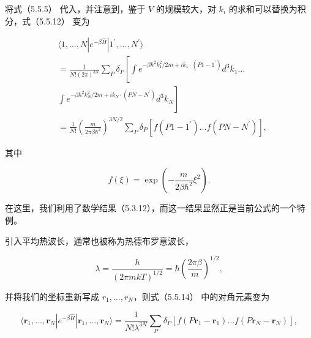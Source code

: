 将式（5.5.5） 代入，并注意到，鉴于 \(V\) 的规模较大，对 \(k_i\) 的求和可以替换为积分，式（5.5.12） 变为

\begin{equation}\tag{5.4.33}\label{eq:5.4.33}
\begin{array}{rl} & { \langle 1 , \ldots , N | e ^{- \beta \hat { H} } | 1 ^{\prime} , \ldots , N ^{\prime} \rangle } \\& {  = \frac { 1 } { N ! \left( 2 \pi \right) ^{3 N} } \sum _ { P } \delta _ { P } \left[ \int e ^{- \beta \hbar ^ { 2} k _ { 1 } ^{2} / 2 m + i k _ { 1 } \cdot ( P 1 - 1 ^{\prime} ) } d ^{3} k _ { 1 } \ldots \right. } \\& {    \left. \int e ^{- \beta \hbar ^ { 2} k _ { N } ^{2} / 2 m + i k _ { N } \cdot ( P N - N ^{\prime} ) } d ^{3} k _ { N } \right] } \\& {  = \frac { 1 } { N ! } \left( \frac { m } { 2 \pi \beta \hbar ^{2} } \right) ^{3 N / 2} \sum _ { P } \delta _ { P } [ f ( P 1 - 1 ^{\prime} ) \ldots f \left( P N - N ^{\prime} \right) ] , } \end{array}
\end{equation}

其中

\begin{equation}\tag{5.4.34}\label{eq:5.4.34}
f ( \xi ) = \exp \left( - \frac { m } { 2 \beta \hbar ^{2} } \xi ^{2} \right) .
\end{equation}

在这里，我们利用了数学结果（5.3.12），而这一结果显然正是当前公式的一个特例。

引入平均热波长，通常也被称为热德布罗意波长，

\begin{equation}\tag{5.4.35}\label{eq:5.4.35}
\lambda = \frac { h } { ( 2 \pi m k T ) ^{1 / 2} } = \hbar \left( \frac { 2 \pi \beta } { m } \right) ^{1 / 2} ,
\end{equation}

并将我们的坐标重新写成 \(r_{1},\ldots,r_{N}\)，则式（5.5.14） 中的对角元素变为

\begin{equation}\tag{5.4.36}\label{eq:5.4.36}
\langle \pmb { r } _ { 1 } , \ldots , \pmb { r } _ { N } | e ^{- \beta \hat { H} } | \pmb { r } _ { 1 } , \ldots , \pmb { r } _ { N } \rangle = \frac { 1 } { N ! \lambda ^{3 N} } \sum _ { P } \delta _ { P } [ f ( P \pmb { r } _ { 1 } - \pmb { r } _ { 1 } ) \ldots f ( P \pmb { r } _ { N } - \pmb { r } _ { N } ) ] ,
\end{equation}

